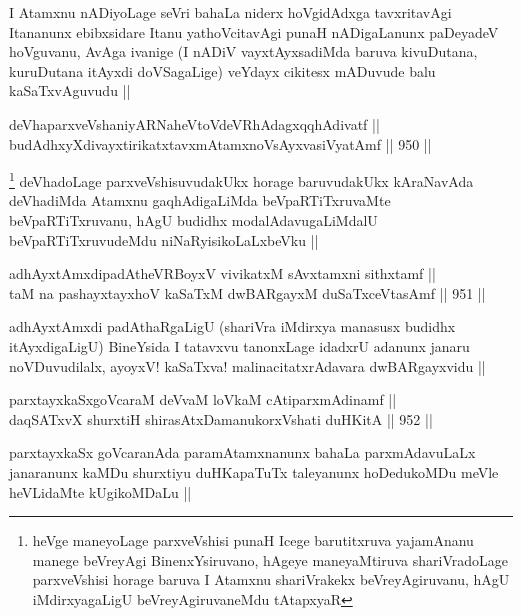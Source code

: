 \begin{artha}
I Atamxnu nADiyoLage seVri bahaLa niderx hoVgidAdxga tavxritavAgi Itananunx ebibxsidare Itanu yathoVcitavAgi punaH nADigaLanunx paDeyadeV hoVguvanu, AvAga ivanige (I nADiV vayxtAyxsadiMda baruva kivuDutana, kuruDutana itAyxdi doVSagaLige) veYdayx cikitesx mADuvude balu kaSaTxvAguvudu ||
\end{artha}


\begin{shl}
deVhaparxveVshaniyARNaheVtoVdeVRhAdagxqqhAdivatf || \\
budAdhxyXdivayxtirikatxtavxmAtamxnoV\s sAyxvasiVyatAmf ||  950 ||  
\end{shl}

\begin{artha}
\footnote{heVge maneyoLage parxveVshisi punaH Icege barutitxruva yajamAnanu manege beVreyAgi BinenxYsiruvano, hAgeye maneyaMtiruva shariVradoLage parxveVshisi horage baruva I Atamxnu shariVrakekx beVreyAgiruvanu, hAgU iMdirxyagaLigU beVreyAgiruvaneMdu tAtapxyaR}
deVhadoLage parxveVshisuvudakUkx horage baruvudakUkx  kAraNavAda deVhadiMda Atamxnu gaqhAdigaLiMda beVpaRTiTxruvaMte beVpaRTiTxruvanu, hAgU budidhx modalAdavugaLiMdalU beVpaRTiTxruvudeMdu niNaRyisikoLaLxbeVku ||
\end{artha}


\begin{shl}
adhAyxtAmxdipadAtheVRBoyxV vivikatxM sAvxtamxni sithxtamf || \\
taM na pashayxtayxhoV kaSaTxM dwBARgayxM duSaTxceVtasAmf ||  951 ||  
\end{shl}

\begin{artha}
adhAyxtAmxdi padAthaRgaLigU (shariVra iMdirxya manasusx budidhx itAyxdigaLigU) BineYsida I tatavxvu tanonxLage idadxrU adanunx janaru noVDuvudilalx, ayoyxV! kaSaTxva! malinacitatxrAdavara dwBARgayxvidu ||
\end{artha}

\begin{shl}
parxtayxkaSxgoVcaraM deVvaM loVkaM cAtiparxmAdinamf || \\
daqSATxvX shurxtiH shirasAtxDamanukorxVshati duHKitA ||  952 ||  
\end{shl}

\begin{artha}
parxtayxkaSx goVcaranAda paramAtamxnanunx bahaLa parxmAdavuLaLx janaranunx kaMDu shurxtiyu duHKapaTuTx taleyanunx hoDedukoMDu meVle heVLidaMte kUgikoMDaLu ||
\end{artha}

